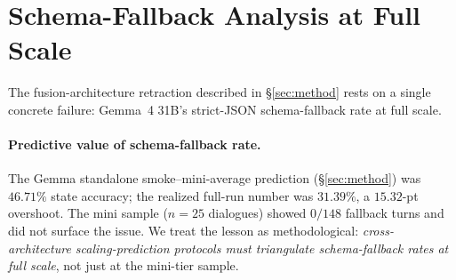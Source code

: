 \documentclass[11pt]{article}
\begin{document}
\section{Schema-Fallback Analysis at Full Scale}
\label{app:fallback}

The fusion-architecture retraction described in \S\ref{sec:method} rests on a single concrete failure: Gemma~4 31B's strict-JSON schema-fallback rate at full scale.

\begin{table}[h]
  \centering
  \small
  \caption{Schema-fallback rate at full $n{=}681$ scale by architecture. Qwen 35B-A3B handles strict-JSON grammar within tolerance; Gemma~4 31B in fusion mode collapses on $21\%$ of turns. The deterministic-classifier integration removes the JSON-schema constraint from the consultant path entirely, structurally bypassing the failure mode.}
  \label{tab:app-fallback}
\end{table}

\paragraph{Predictive value of schema-fallback rate.} The Gemma standalone smoke--mini-average prediction (\S\ref{sec:method}) was $46.71\%$ state accuracy; the realized full-run number was $31.39\%$, a $15.32$-pt overshoot. The mini sample ($n{=}25$ dialogues) showed $0/148$ fallback turns and did not surface the issue. We treat the lesson as methodological: \emph{cross-architecture scaling-prediction protocols must triangulate schema-fallback rates at full scale}, not just at the mini-tier sample.
\end{document}
